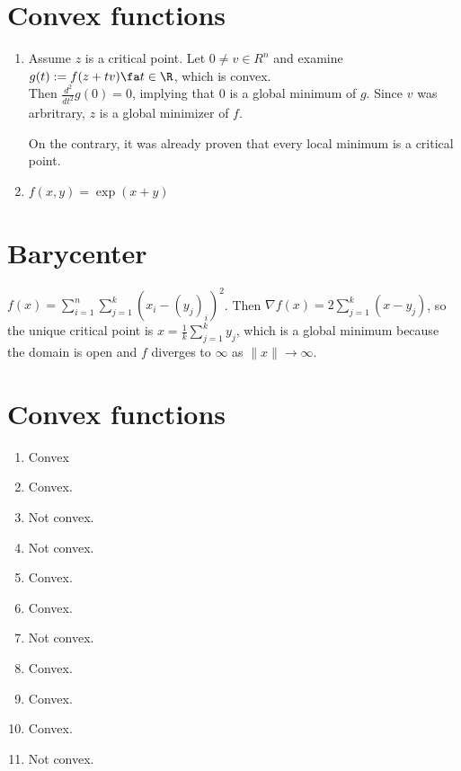 \documentclass{article}
\begin{document}

\section{Convex functions}
\begin{enumerate}
    \item Assume $z$ is a critical point. Let $0 \neq v \in R^n$ and examine $g(t) := f(z + tv) \fa t \in \R$, which is convex. \\ 
    Then $\frac{d^2}{dt^2} g(0) = 0$, implying that $0$ is a global minimum of $g$. Since $v$ was arbritrary, $z$ is a global minimizer of $f$. 
    
    On the contrary, it was already proven that every local minimum is a critical point. 
    
    \item $f(x, y) = \exp(x + y)$
\end{enumerate}

\addtocounter{section}{2}

\section{Barycenter}
$f(x) = \sum_{i=1}^{n} \sum_{j=1}^{k} (x_i - (y_j)_i)^2$. Then $\nabla f(x) = 2 \sum_{j=1}^{k} (x - y_j)$, so the unique critical point is $x = \frac{1}{k} \sum_{j=1}^{k} y_j$, which is a global minimum because the domain is open and $f$ diverges to $\infty$ as $\|x\| \to \infty$.

\addtocounter{section}{1}


\section{Convex functions}
\begin{enumerate}
    \item Convex
    \item Convex.
    \item Not convex. 
    \item Not convex. 
    \item Convex. 
    \item Convex. 
    \item Not convex.
    \item Convex.
    \item Convex.
    \item Convex.  
    \item Not convex.
\end{enumerate}
\end{document}
